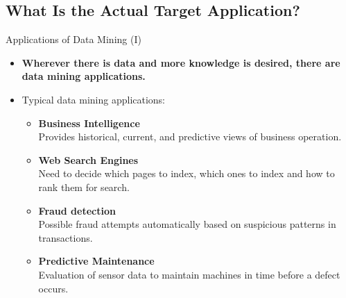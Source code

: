 \subsection{What Is the Actual Target Application?}

\begin{frame}{Applications of Data Mining (I)}
	\begin{itemize}
		\item \textbf{Wherever there is data and more knowledge is desired,
			      there are data mining applications.}\\
		\item Typical data mining applications:
		      \begin{itemize}
			      \item \textbf{Business Intelligence} \\
			            \small{Provides historical, current, and predictive views of
				            business operation.}
			      \item \textbf{Web Search Engines} \\
			            \small{Need to decide which pages to index, which ones to
				            index and how to rank them for search.}
			      \item \textbf{Fraud detection} \\
			            \small{Possible fraud attempts automatically based on
				            suspicious patterns in transactions.}
			      \item \textbf{Predictive Maintenance} \\
			            \small{Evaluation of sensor data to maintain machines in time
				            before a defect occurs.}
		      \end{itemize}
	\end{itemize}
\end{frame}

